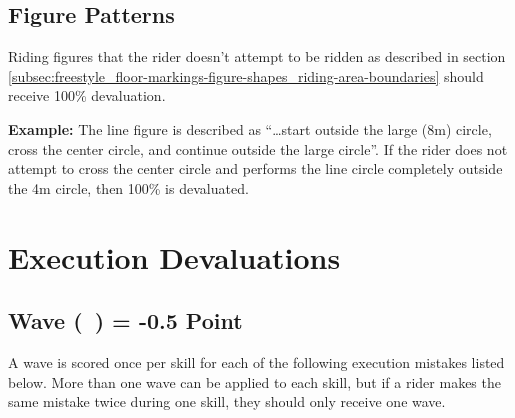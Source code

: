 \subsection{Figure Patterns}
Riding figures that the rider doesn't attempt to be ridden as described in section \ref{subsec:freestyle_floor-markings-figure-shapes_riding-area-boundaries} should receive 100\% devaluation.

\textbf{Example:} The line figure is described as ``…start outside the large (8m) circle, cross the center circle, and continue outside the large circle''.
If the rider does not attempt to cross the center circle and performs the line circle completely outside the 4m circle, then 100\% is devaluated.

\section{Execution Devaluations}

\subsection{Wave (~) = -0.5 Point}
A wave is scored once per skill for each of the following execution mistakes listed below.
More than one wave can be applied to each skill, but if a rider makes the same mistake twice during one skill, they should only receive one wave.

